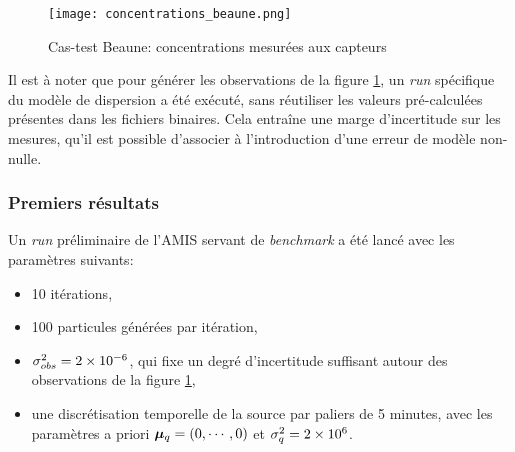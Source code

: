 %




\begin{figure}[h!]
	\centering
	\texttt{[image: concentrations\_beaune.png]}
	\caption{Cas-test Beaune: concentrations mesurées aux capteurs}
	\label{fig_observations_25CAPTEURS}
\end{figure}

{
Il est à noter que pour générer les observations de la figure \ref{fig_observations_25CAPTEURS}, un \textit{run} spécifique du modèle de dispersion a été exécuté, sans réutiliser les valeurs pré-calculées présentes dans les fichiers binaires. Cela entraîne une marge d'incertitude sur les mesures, qu'il est possible d'associer à l'introduction d'une erreur de modèle non-nulle.
}

\subsubsection{Premiers résultats}

Un \textit{run} préliminaire de l'AMIS servant de \textit{benchmark} a été lancé avec les paramètres suivants:
\begin{itemize}
	\item 10 itérations,
	\item 100 particules générées par itération,
	\item ${\sigma_{obs}^2} = 2\times 10^{-6}$, qui fixe un degré d'incertitude suffisant autour des observations de la figure \ref{fig_observations_25CAPTEURS},
	\item une discrétisation temporelle de la source par paliers de 5 minutes, avec les paramètres a priori ${\bm{\mu}_q} = (0,\cdots,0)$ et $\sigma_q^2 = 2\times 10^6$.
\end{itemize}

